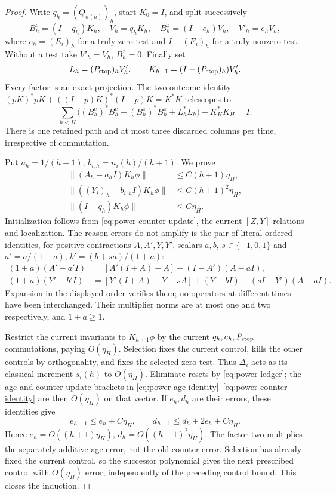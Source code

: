 \begin{proof}
Write $q_h=(Q_{\sigma(h)})_h$, start $K_0=I$, and split successively
\[
 B_h^c=(I-q_h)K_h,\quad V_h=q_hK_h,\quad
 B_h^z=(I-e_h)V_h,\quad V'_h=e_hV_h,
\]
where $e_h=(E_i)_h$ for a truly zero test and $I-(E_i)_h$ for a truly nonzero test. Without a test take $V'_h=V_h$, $B_h^z=0$. Finally set
\begin{equation}\label{eq:power-columns}
 L_h=(P_{\rm stop})_hV'_h,\qquad K_{h+1}=(I-(P_{\rm stop})_h)V'_h.
\end{equation}
Every factor is an exact projection. The two-outcome identity $(pK)^*pK+((I-p)K)^*(I-p)K=K^*K$ telescopes to
\begin{equation}\label{eq:power-complete-columns}
 \sum_{h<H}\bigl((B_h^c)^*B_h^c+(B_h^z)^*B_h^z+L_h^*L_h\bigr)+K_H^*K_H=I.
\end{equation}
There is one retained path and at most three discarded columns per time, irrespective of commutation.

Put $a_h=1/(h+1)$, $b_{i,h}=n_i(h)/(h+1)$. We prove
\begin{align*}
 \|(A_h-a_hI)K_h\phi\|&\le C(h+1)\eta_H,\\
 \|((Y_i)_h-b_{i,h}I)K_h\phi\|&\le C(h+1)^2\eta_H,\\
 \|(I-q_h)K_h\phi\|&\le C\eta_H.
\end{align*}
Initialization follows from \eqref{eq:power-counter-update}, the current $[Z,Y]$ relations and localization. The reason errors do not amplify is the pair of literal ordered identities, for positive contractions $A,A',Y,Y'$, scalars $a,b$, $s\in\{-1,0,1\}$ and $a'=a/(1+a)$, $b'=(b+sa)/(1+a)$:
\begin{align}
 (1+a)(A'-a'I)&=[A'(I+A)-A]+(I-A')(A-aI),\label{eq:power-age-identity}\\
 (1+a)(Y'-b'I)&=[Y'(I+A)-Y-sA]+(Y-bI)+(sI-Y')(A-aI).\label{eq:power-counter-identity}
\end{align}
Expansion in the displayed order verifies them; no operators at different times have been interchanged. Their multiplier norms are at most one and two respectively, and $1+a\ge1$.

Restrict the current invariants to $K_{h+1}\phi$ by the current $q_h,e_h,P_{\rm stop}$ commutations, paying $O(\eta_H)$. Selection fixes the current control, kills the other controls by orthogonality, and fixes the selected zero test. Thus $\Delta_i$ acts as its classical increment $s_i(h)$ to $O(\eta_H)$. Eliminate resets by \eqref{eq:power-ledger}; the age and counter update brackets in \eqref{eq:power-age-identity}--\eqref{eq:power-counter-identity} are then $O(\eta_H)$ on that vector. If $e_h,d_h$ are their errors, these identities give
\[
 e_{h+1}\le e_h+C\eta_H,\qquad d_{h+1}\le d_h+2e_h+C\eta_H.
\]
Hence $e_h=O((h+1)\eta_H)$, $d_h=O((h+1)^2\eta_H)$. The factor two multiplies the separately additive age error, not the old counter error. Selection has already fixed the current control, so the successor polynomial gives the next prescribed control with $O(\eta_H)$ error, independently of the preceding control bound. This closes the induction.


\end{proof}
